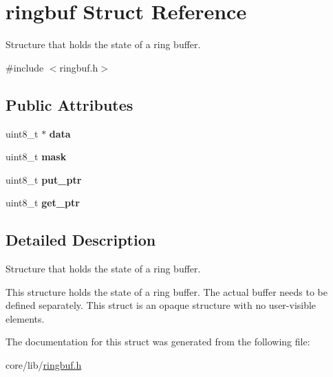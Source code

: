 \hypertarget{structringbuf}{\section{ringbuf Struct Reference}
\label{structringbuf}
}


Structure that holds the state of a ring buffer.  




{\ttfamily \#include $<$ringbuf.\-h$>$}

\subsection*{Public Attributes}
\begin{DoxyCompactItemize}
\item 
\hypertarget{group__ringbuf_gae1472129ec96ef39782f87836fb670da}{uint8\-\_\-t $\ast$ {\bfseries data}}\label{group__ringbuf_gae1472129ec96ef39782f87836fb670da}

\item 
\hypertarget{group__ringbuf_ga78d6347a4464086fdbae6258c1e603c4}{uint8\-\_\-t {\bfseries mask}}\label{group__ringbuf_ga78d6347a4464086fdbae6258c1e603c4}

\item 
\hypertarget{group__ringbuf_gad8ed0f67d2d85a7707d271ae9386dcf8}{uint8\-\_\-t {\bfseries put\-\_\-ptr}}\label{group__ringbuf_gad8ed0f67d2d85a7707d271ae9386dcf8}

\item 
\hypertarget{group__ringbuf_gaf4b195d1d47a3190deb1d646e9a04528}{uint8\-\_\-t {\bfseries get\-\_\-ptr}}\label{group__ringbuf_gaf4b195d1d47a3190deb1d646e9a04528}

\end{DoxyCompactItemize}


\subsection{Detailed Description}
Structure that holds the state of a ring buffer. 

This structure holds the state of a ring buffer. The actual buffer needs to be defined separately. This struct is an opaque structure with no user-\/visible elements. 

The documentation for this struct was generated from the following file\-:\begin{DoxyCompactItemize}
\item 
core/lib/\hyperlink{ringbuf_8h}{ringbuf.\-h}\end{DoxyCompactItemize}
